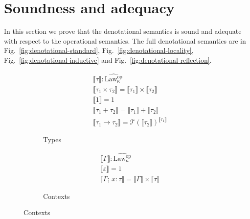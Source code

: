 \documentclass[acmsmall, screen, review, anonymous]{acmart}
\theoremstyle{definition}
\newcommand{\arr}{\rightarrow}
\newcommand{\lawcop}{\mathrm{Law_{\kappa}^{op}}}
\newcommand{\pshlawcop}{\widehat{\lawcop}}
\newcommand{\arrow}[2]{{#2}^{#1}}
\newcommand{\sem}[1]{\llbracket #1 \rrbracket}
\newcommand{\mon}{\mathcal{T}}
\newcommand{\types}{\mathrel{:}}
\newcommand{\cempty}{\varepsilon}
\newcommand{\ccons}[2]{#1;\,#2}
\newcommand{\lbind}[3]{\ccons{#1}{#2\types#3}}
\begin{document}
\section{Soundness and adequacy}
\label{apdx:denotational}

In this section we prove that the denotational semantics is sound and
adequate with respect to the operational semantics. The full
denotational semantics are in Fig.~\ref{fig:denotational-standard},
Fig.~\ref{fig:denotational-locality},
Fig.~\ref{fig:denotational-inductive} and
Fig.~\ref{fig:denotational-reflection}.

\begin{figure}
\begin{subfigure}[t]{0.45\textwidth}
\begin{align*}
&\sem{\tau} \mathrel{:} \pshlawcop \\
&\sem{\tau_1 \times \tau_2} = \sem{\tau_1} \times \sem{\tau_2} \\
&\sem{1} = 1 \\
&\sem{\tau_1 + \tau_2} = \sem{\tau_1} + \sem{\tau_2} \\
&\sem{\tau_1 \arr \tau_2} = \arrow{\sem{\tau_1}}{\mon(\sem{\tau_2})}
\end{align*}
\caption{Types}
\end{subfigure}
\hfill
\begin{subfigure}[t]{0.45\textwidth}
\begin{align*}
&\sem{\Gamma} \mathrel{:} \pshlawcop \\
&\sem{\cempty} = 1 \\
&\sem{\lbind{\Gamma}{x}{\tau}} = \sem{\Gamma} \times \sem{\tau}
\end{align*}
\caption{Contexts}
\end{subfigure}


\end{figure}
\end{document}
